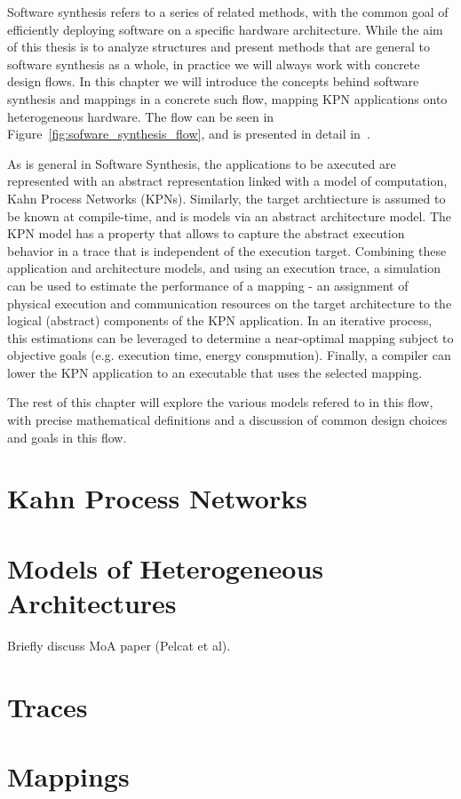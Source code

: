 Software synthesis refers to a series of related methods, with the common goal of efficiently deploying software on a specific hardware architecture. While the aim of this thesis is to analyze structures and present methods that are general to software synthesis as a whole, in practice we will always work with concrete design flows. In this chapter we will introduce the concepts behind software synthesis and mappings in a concrete such flow, mapping KPN applications onto heterogeneous hardware. The flow can be seen in Figure~\ref{fig:sofware_synthesis_flow}, and is presented in detail in~\cite{castrillon_phd}.

As is general in Software Synthesis, the applications to be axecuted are represented with an abstract representation linked with a model of computation, Kahn Process Networks (KPNs). Similarly, the target archtiecture is assumed to be known at compile-time, and is models via an abstract architecture model. The KPN model has a property that allows to capture the abstract execution behavior in a trace that is independent of the execution target. Combining these application and architecture models, and using an execution trace, a simulation can be used to estimate the performance of a mapping - an assignment of physical execution and communication resources on the target architecture to the logical (abstract) components of the KPN application. In an iterative process, this estimations can be leveraged to determine a near-optimal mapping subject to objective goals (e.g. execution time, energy conspmution). Finally, a compiler can lower the KPN application to an executable that uses the selected mapping.

The rest of this chapter will explore the various models refered to in this flow, with precise mathematical definitions and a discussion of common design choices and goals in this flow.

\section{Kahn Process Networks}
\Blindtext[2]

\section{Models of Heterogeneous Architectures}
\Blindtext[2]
Briefly discuss MoA paper (Pelcat et al).

\section{Traces}
\Blindtext[2]


\section{Mappings}
\Blindtext[2]
